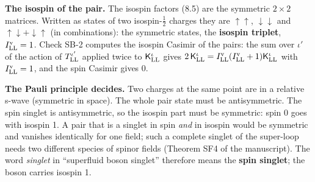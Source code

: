 \documentclass[
  10pt,
]{article}
\begin{document}
\textbf{The isospin of the pair.} The isospin factors (8.5) are the
symmetric \(2\times2\) matrices. Written as states of two
isospin-\(\tfrac12\) charges they are \(\uparrow\uparrow\),
\(\downarrow\downarrow\) and \(\uparrow\downarrow+\downarrow\uparrow\)
(in combinations): the symmetric states, the \textbf{isospin triplet},
\(I^{\rm v}_{\rm LL}=1\). Check SB-2 computes the isospin Casimir of the
pairs: the sum over \(\iota'\) of the action of \(T^{\iota'}_{\rm LL}\)
applied twice to \(\mathsf K^\iota_{\rm LL}\) gives
\(2\,\mathsf K^\iota_{\rm LL}=I^{\rm v}_{\rm LL}(I^{\rm v}_{\rm LL}+1)\mathsf K^\iota_{\rm LL}\)
with \(I^{\rm v}_{\rm LL}=1\), and the spin Casimir gives 0.

\textbf{The Pauli principle decides.} Two charges at the same point are
in a relative s-wave (symmetric in space). The whole pair state must be
antisymmetric. The spin singlet is antisymmetric, so the isospin part
must be symmetric: spin 0 goes with isospin 1. A pair that is a singlet
in spin \emph{and} in isospin would be symmetric and vanishes
identically for one field; such a complete singlet of the super-loop
needs two different species of spinor fields (Theorem SF4 of the
manuscript). The word \emph{singlet} in ``superfluid boson singlet''
therefore means the \textbf{spin singlet}; the boson carries isospin 1.
\end{document}
